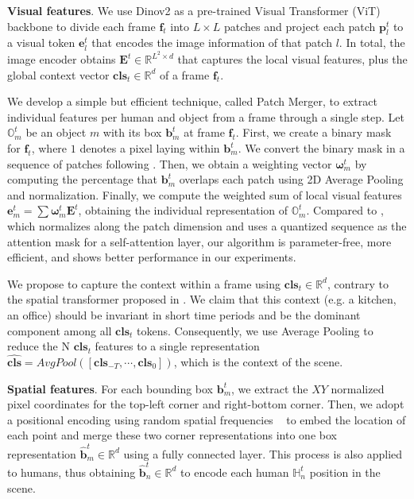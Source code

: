 \documentclass{article}
\begin{document}
\textbf{Visual features}. We use Dinov2 \citep{oquab2023dinov2} as a pre-trained Visual Transformer (ViT) \citep{dosovitskiy2020vit} backbone to divide each frame $\mathbf{f}_{t}$ into $L \times L$ patches and project each patch $\mathbf{p}_l^t$ to a visual token $\mathbf{e}_l^t$ that encodes the image information of that patch $l$. In total, the image encoder obtains $\mathbf{E}^t \in \mathbb{R}^{L^2\times d}$ that captures the local visual features, plus the global context vector $\mathbf{cls}_t \in \mathbb{R}^{d}$ of a frame $\mathbf{f}_t$. 

We develop a simple but efficient technique, called Patch Merger, to extract individual features per human and object from a frame through a single step. Let $\mathbb{O}_m^t$ be an object $m$ with its box $\mathbf{b}_m^t$ at frame $\mathbf{f}_{t}$. First, we create a binary mask for $\mathbf{f}_{t}$, where $1$ denotes a pixel laying within $\mathbf{b}_m^t$. We convert the binary mask in a sequence of patches following \cite{dosovitskiy2020vit}. Then, we obtain a weighting vector $\boldsymbol{\omega}_m^t$ by computing the percentage that $\mathbf{b}_m^t$ overlaps each patch using 2D Average Pooling and normalization. Finally, we compute the weighted sum of local visual features $\mathbf{e}_m^t = \sum {\boldsymbol{\omega}_m^t \mathbf{E}^t}$, obtaining the individual representation of $\mathbb{O}_m^t$. Compared to \citep{park2023viplo}, which normalizes along the patch dimension and uses a quantized sequence as the attention mask for a self-attention layer, our algorithm is parameter-free, more efficient, and shows better performance in our experiments.

We propose to capture the context within a frame using $\mathbf{cls}_t  \in \mathbb{R}^{d}$, contrary to the spatial transformer proposed in \citep{NI2023103741}. We claim that this context (e.g. a kitchen, an office) should be invariant in short time periods and be the dominant component among all $\mathbf{cls}_t$ tokens. Consequently,  we use Average Pooling to reduce the N $\mathbf{cls}_t$ features to a single representation $\mathbf{\widehat{cls}} = AvgPool([\mathbf{cls}_{-T},\cdots,\mathbf{cls}_{0}])$, which is the context of the scene. 

\textbf{Spatial features}. For each bounding box $\mathbf{b}_m^t$, we extract the $XY$ normalized pixel coordinates for the top-left corner and right-bottom corner. Then, we adopt a positional encoding using random spatial frequencies ~\citep{posembed_fourier} to embed the location of each point and merge these two corner representations into one box representation $\hat{\mathbf{b}}_m^t \in \mathbb{R}^{d}$ using a fully connected layer.  This process is also applied to humans, thus obtaining $\hat{\mathbf{b}}_n^t \in \mathbb{R}^{d}$ to encode each human $\mathbb{H}_n^t$ position in the scene.
\end{document}
